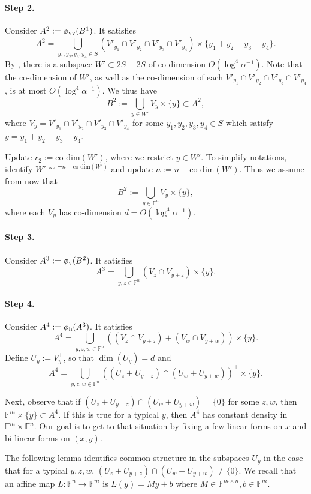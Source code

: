 \documentclass[12pt]{article}
\newcommand{\F}{\mathbb{F}}
\newcommand{\hr}{\textup{h}}
\newcommand{\vr}{\textup{v}}
\newcommand{\codim}{\text{co-dim}}
\begin{document}
\paragraph{Step 2.}
Consider $A^2:=\phi_{\vr\vr}(B^1)$. It satisfies
$$
A^2=\bigcup_{y_1,y_2,y_3,y_4 \in S} \left( V'_{y_1} \cap V'_{y_2} \cap V'_{y_3} \cap V'_{y_4} \right) \times \{y_1+y_2-y_3-y_4\}.
$$
By , there is a subspace $W' \subset 2S - 2S$ of co-dimension $O(\log^4\alpha^{-1})$. Note that the co-dimension
of $W'$, as well as the co-dimension of each $V'_{y_1} \cap V'_{y_2} \cap V'_{y_3} \cap V'_{y_4}$, is at most $O(\log^4\alpha^{-1})$.
We thus have
$$
B^2:=\bigcup_{y \in W'} V_y \times \{y\} \subset A^2,
$$
where $V_y = V'_{y_1} \cap V'_{y_2} \cap V'_{y_3} \cap V'_{y_4}$ for some $y_1,y_2,y_3,y_4 \in S$ which satisfy $y=y_1+y_2-y_3-y_4$.

Update $r_2 := \codim(W')$, where we restrict $y \in W'$. To simplify notations, identify $W' \cong \F^{n-\codim(W')}$
and update $n := n - \codim(W')$. Thus we assume from now that
$$
B^2:=\bigcup_{y \in \F^n} V_y \times \{y\},
$$
where each $V_y$ has co-dimension $d=O(\log^4\alpha^{-1})$.

\paragraph{Step 3.}
Consider $A^3:=\phi_{\vr}(B^2)$. It satisfies
$$
A^3=\bigcup_{y,z \in \F^n} \left( V_{z} \cap V_{y+z} \right) \times \{y\}.
$$

\paragraph{Step 4.}
Consider $A^4 := \phi_{\hr}(A^3)$. It satisfies
$$
A^4=\bigcup_{y,z,w\in \F^n}\left( \left( V_{z} \cap V_{y+z} \right) + \left( V_{w} \cap V_{y+w} \right) \right ) \times \{y\}.
$$
Define $U_y := V_y^\perp$, so that $\dim(U_y)=d$ and
$$
A^4=\bigcup_{y,z,w \in \F^n} \left( \left( U_{z} + U_{y+z} \right) \cap \left( U_{w} + U_{y+w} \right) \right )^{\perp} \times \{y\}.
$$

Next, observe that if $\left( U_{z} + U_{y+z} \right) \cap \left( U_{w} + U_{y+w} \right)=\{0\}$ for some $z,w$, then
$\F^m \times \{y\} \subset A^4$. If this is true for a typical $y$, then $A^4$ has constant density in $\F^m \times \F^n$. Our goal is to get to that situation by fixing a few linear forms on $x$ and bi-linear forms on $(x,y)$.	

The following lemma identifies common structure in the subspaces $U_y$ in the case that for a typical $y,z,w$,
$\left( U_{z} + U_{y+z} \right) \cap \left( U_{w} + U_{y+w} \right) \ne \{0\}$.
We recall that an affine map $L:\F^n \to \F^m$ is $L(y)=My+b$ where $M \in \F^{m \times n}, b \in \F^m$.
\end{document}
